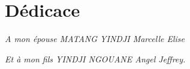 \chapter*{Dédicace}
\vspace{7cm}
\begin{flushright}
	\textit{A mon épouse MATANG YINDJI Marcelle Elise}
	\par \textit{Et à mon fils YINDJI NGOUANE Angel Jeffrey.}
\end{flushright}